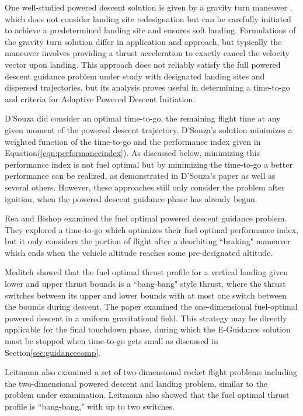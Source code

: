 One well-studied powered descent solution is given by a gravity turn maneuver \cite{MCINNES,CHOMEL,CITRON}, which does not consider landing site redesignation but can be carefully initiated to achieve a predetermined landing site and ensures soft landing. Formulations of the gravity turn solution differ in application and approach, but typically the maneuver involves providing a thrust acceleration to exactly cancel the velocity vector upon landing. This approach does not reliably satisfy the full powered descent guidance problem under study with designated landing sites and dispersed trajectories, but its analysis proves useful in determining a time-to-go and criteria for Adaptive Powered Descent Initiation.

D'Souza\:\cite{DSOUZA} did consider an optimal time-to-go, the remaining flight time at any given moment of the powered descent trajectory. D'Souza's solution minimizes a weighted function of the time-to-go and the performance index given in Equation\:(\ref{eqn:performanceindex}). As discussed below, minimizing this performance index is not fuel optimal but by minimizing the time-to-go a better performance can be realized, as demonstrated in D'Souza's paper as well as several others\:\cite{NAJSON,ROSS}. However, these approaches still only consider the problem after ignition, when the powered descent guidance phase has already begun.

Rea and Bishop\:\cite{REA} examined the fuel optimal powered descent guidance problem. They explored a time-to-go which optimizes their fuel optimal performance index, but it only considers the portion of flight after a deorbiting ``braking" maneuver which ends when the vehicle altitude reaches some pre-designated altitude.

Meditch\:\cite{MEDITCH} showed that the fuel optimal thrust profile for a vertical landing given lower and upper thrust bounds is a ``bang-bang" style thrust, where the thrust switches between its upper and lower bounds with at most one switch between the bounds during descent. The paper examined the one-dimensional fuel-optimal powered descent in a uniform gravitational field. This strategy may be directly applicable for the final touchdown phase, during which the E-Guidance solution must be stopped when time-to-go gets small as discussed in Section\:\ref{sec:guidancecomp}.

Leitmann\:\cite{LEITMANN} also examined a set of two-dimensional rocket flight problems including the two-dimensional powered descent and landing problem, similar to the problem under examination. Leitmann also showed that the fuel optimal thrust profile is ``bang-bang," with up to two switches.


